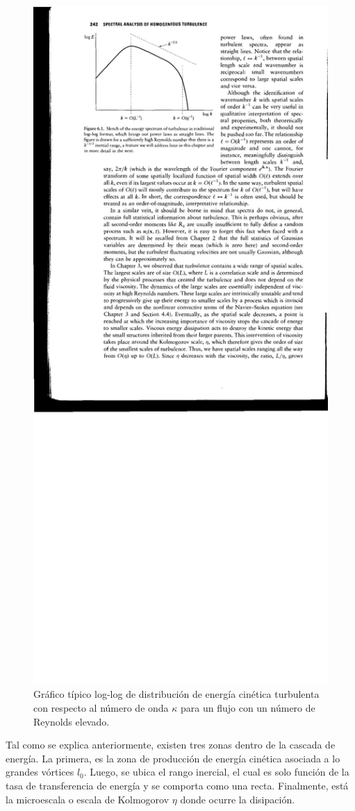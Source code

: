 \begin{figure}[h!]
	\centering
	\includegraphics[width=0.7\linewidth,trim={3.2cm 18.3cm 7.0cm 1.5cm},clip]{Imagenes/03/spectra}
	\caption{Gráfico típico log-log de distribución de energía cinética turbulenta con respecto al número de onda $\kappa$ para un flujo con un número de Reynolds elevado.}
	\label{fig:03_spectra}
\end{figure}

Tal como se explica anteriormente, existen tres zonas dentro de la cascada de energía. La primera, es la zona de producción de energía cinética asociada a lo grandes vórtices $l_0$. Luego, se ubica el rango inercial, el cual es solo función de la tasa de transferencia de energía y se comporta como una recta. Finalmente, está la microescala o escala de Kolmogorov $\eta$ donde ocurre la disipación.

